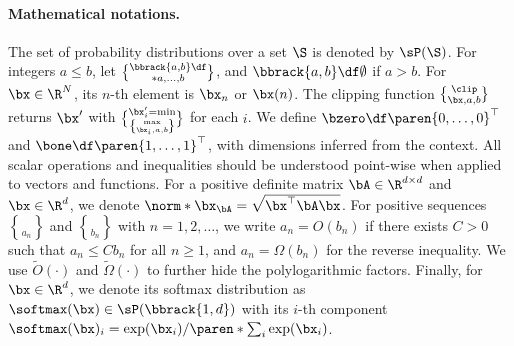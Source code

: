 \paragraph{Mathematical notations.}
The set of probability distributions over a set $\S$ is denoted by $\sP(\S)$.
For integers $a \leq b$, let $\bbrack{a,b}\df \brace*{a,\dots, b}$, and $\bbrack{a, b} \df \emptyset$ if $a > b$.
For $\bx \in \R^N$, its $n$-th element is $\bx_n$ or $\bx(n)$.
The clipping function $\clip\brace{\bx, a, b}$ returns $\bx'$ with $\bx'_i = \min\brace{\max\brace{\bx_i, a}, b}$ for each $i$.
We define $\bzero \df \paren{0, \ldots, 0}^\top$ and $\bone \df \paren{1, \ldots, 1}^\top$, with dimensions inferred from the context.
All scalar operations and inequalities should be understood point-wise when applied to vectors and functions.
For a positive definite matrix $\bA \in \R^{d\times d}$ and $\bx \in \R^d$, we denote $\norm*{\bx}_\bA = \sqrt{\bx^\top \bA \bx}$.
For positive sequences $\brace{a_n}$ and $\brace{b_n}$ with $n=1,2, \ldots$, we write $a_n=O\left(b_n\right)$ if there exists $C>0$ such that $a_n \leq C b_n$ for all $n \geq 1$, and $a_n = \Omega(b_n)$ for the reverse inequality.
We use $\widetilde{O}(\cdot)$ and $\widetilde{\Omega}(\cdot)$ to further hide the polylogarithmic factors.
Finally, for $\bx \in \R^d$, we denote its softmax distribution as $\softmax(\bx) \in \sP(\bbrack{1, d})$ with its $i$-th component $\softmax(\bx)_i = \exp(\bx_i) / \paren*{\sum_{i} \exp(\bx_i)}$.

